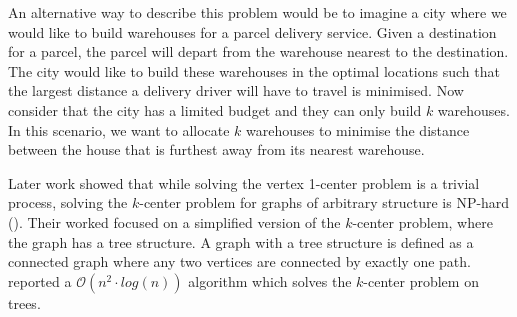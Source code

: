 An alternative way to describe this problem would be to imagine a city where we would like to build warehouses for a parcel delivery service. Given a destination for a parcel, the parcel will depart from the warehouse nearest to the destination. The city would like to build these warehouses in the optimal locations such that the largest distance a delivery driver will have to travel is minimised. Now consider that the city has a limited budget and they can only build \(k\) warehouses. In this scenario, we want to allocate $k$ warehouses to minimise the distance between the house that is furthest away from its nearest warehouse.

Later work showed that while solving the vertex 1-center problem is a trivial process, solving the $k$-center problem for graphs of arbitrary structure is NP-hard (\cite{kariv_algorithmic_1979}). Their worked focused on a simplified version of the $k$-center problem, where the graph has a tree structure. A graph with a tree structure is defined as a connected graph where any two vertices are connected by exactly one path. \textcite{kariv_algorithmic_1979} reported a $\mathcal{O}(n^2\cdot log(n))$ algorithm which solves the $k$-center problem on trees.

